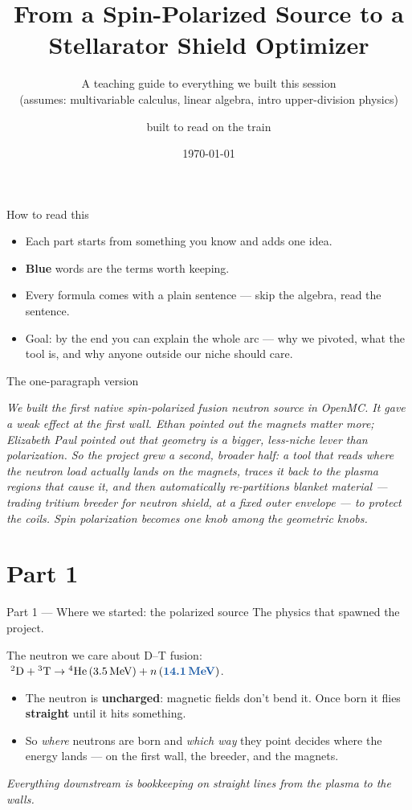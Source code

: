 \documentclass[11pt,aspectratio=169]{beamer}
\title{From a Spin-Polarized Source to a Stellarator Shield Optimizer}
\subtitle{A teaching guide to everything we built this session\\{\small (assumes: multivariable calculus, linear algebra, intro upper-division physics)}}
\author{built to read on the train}
\date{\today}
\newcommand{\key}[1]{\textcolor{key}{\textbf{#1}}}
\newcommand{\qq}[1]{\begin{center}\emph{#1}\end{center}}
\begin{document}
\frame{\titlepage}

\begin{frame}{How to read this}
\begin{itemize}
\item Each part starts from something you know and adds one idea.
\item \key{Blue} words are the terms worth keeping.
\item Every formula comes with a plain sentence --- skip the algebra, read the sentence.
\item Goal: by the end you can explain the whole arc --- why we pivoted, what the tool is,
      and why anyone outside our niche should care.
\end{itemize}
\end{frame}

\begin{frame}{The one-paragraph version}
\qq{We built the first native spin-polarized fusion neutron source in OpenMC. It gave a
weak effect at the first wall. Ethan pointed out the magnets matter more; Elizabeth Paul
pointed out that geometry is a bigger, less-niche lever than polarization. So the project
grew a second, broader half: a tool that reads where the neutron load actually lands on the
magnets, traces it back to the plasma regions that cause it, and then automatically
re-partitions blanket material --- trading tritium breeder for neutron shield, at a fixed
outer envelope --- to protect the coils. Spin polarization becomes one knob among the
geometric knobs.}
\end{frame}

\section{Part 1}
\begin{frame}{Part 1 --- Where we started: the polarized source}\Large
The physics that spawned the project.\end{frame}

\begin{frame}{The neutron we care about}
D--T fusion: \(\ {}^2\mathrm D + {}^3\mathrm T \rightarrow {}^4\mathrm{He}\,(3.5\,\text{MeV})
+ n\,(\key{14.1\,\text{MeV}})\).
\begin{itemize}
\item The neutron is \key{uncharged}: magnetic fields don't bend it. Once born it flies
      \key{straight} until it hits something.
\item So \emph{where} neutrons are born and \emph{which way} they point decides where the
      energy lands --- on the first wall, the breeder, and the magnets.
\end{itemize}
\qq{Everything downstream is bookkeeping on straight lines from the plasma to the walls.}
\end{frame}
\end{document}
